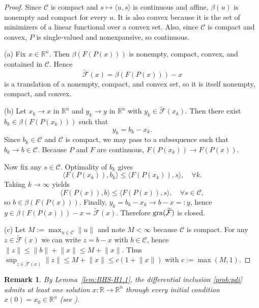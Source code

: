 \documentclass[pdflatex,sn-mathphys-num]{sn-jnl}%
\newcommand\gra{\mathop{\rm gra}}
\newcommand\R{\mathbb{R}}
\newcommand\C{\mathcal{C}}
\newcommand\mF{\mathcal{F}}
\newcommand\tmF{\widetilde{\mF}}
\theoremstyle{thmstyleone}%
\theoremstyle{thmstyletwo}%
\newtheorem{remark}{Remark}%
\theoremstyle{thmstylethree}%
\begin{document}
\begin{proof}
Since $\C$ is compact and $s\mapsto\langle u,s\rangle$ is continuous and affine,
$\beta(u)$ is nonempty and compact for every $u$. It is also convex because it is the
set of minimizers of a linear functional over a convex set. Also, since $\C$ is compact and convex, $P$ is single-valued
and nonexpansive, so continuous.

(a) Fix $x\in\R^n$. Then $\beta(F(P(x)))$ is nonempty, compact, convex, and contained in $\C$.
Hence
\[
  \tmF(x)=\beta(F(P(x))) - x
\]
is a translation of a nonempty, compact, and convex set, so it is itself nonempty, compact, and convex.

(b) Let $x_k\to x$ in $\R^n$ and $y_k\to y$ in $\R^n$ with $y_k\in\tmF(x_k)$.
Then there exist $b_k\in \beta(F(P(x_k)))$ such that
\[
  y_k=b_k-x_k.
\]
Since $b_k\in\C$ and $\C$ is compact, we may pass to a subsequence such that $b_k\to b\in\C$.
Because $P$ and $F$ are continuous, $F(P(x_k))\to F(P(x))$.

Now fix any $s\in\C$. Optimality of $b_k$ gives
\[
  \langle F(P(x_k)), b_k\rangle \leq \langle F(P(x_k)), s\rangle, \quad \forall k.
\]
Taking $k\to\infty$ yields
\[
  \langle F(P(x)), b\rangle \le \langle F(P(x)), s\rangle, \quad \forall s\in\C,
\]
so $b\in \beta(F(P(x)))$. Finally, $y_k=b_k-x_k\to b-x=:y$, hence
$y\in \beta(F(P(x))) - x = \tmF(x)$. Therefore $\gra(\tmF)$ is closed.

(c) Let $M:=\max_{u\in\C}\lVert u\rVert$ and note $M < \infty$ because $\C$ is compact. For any $z\in\tmF(x)$ we can write
$z=b-x$ with $b\in\C$, hence $\lVert z\rVert \leq \lVert b\rVert + \lVert x\rVert \leq M+\lVert x\rVert$.
Thus $\sup_{z\in\tmF(x)}\lVert z\rVert \leq M+\lVert x\rVert \leq c(1+\lVert x\rVert)$ with $c:=\max(M,1)$.
\end{proof}

\begin{remark}\label{rem:existence}
By Lemma~\ref{lem:BHS-H1.1}, the differential inclusion \eqref{prob:pdi} admits at least one solution $x : \R \to \R^n$ through every initial
condition $x(0) = x_0\in\R^n$ (see \cite[Section~1.2]{Benaim2005}).
\end{remark}
\end{document}
